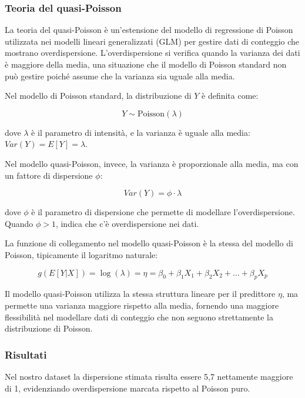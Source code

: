 \documentclass[
  italian,
  a4paper,
  a4paper,
  twoside,
  open=right,
  12pt]{scrbook}
\theoremstyle{definition}
\theoremstyle{remark}
\begin{document}
\subsubsection{Teoria del quasi-Poisson}\label{teoria-del-quasi-poisson}

La teoria del quasi-Poisson è un'estensione del modello di regressione
di Poisson utilizzata nei modelli lineari generalizzati (GLM) per
gestire dati di conteggio che mostrano overdispersione.
L'overdispersione si verifica quando la varianza dei dati è maggiore
della media, una situazione che il modello di Poisson standard non può
gestire poiché assume che la varianza sia uguale alla media.

Nel modello di Poisson standard, la distribuzione di \(Y\) è definita
come:

\[
Y \sim \text{Poisson}(\lambda)
\]

dove \(\lambda\) è il parametro di intensità, e la varianza è uguale
alla media: \(Var(Y) = E[Y] = \lambda\).

Nel modello quasi-Poisson, invece, la varianza è proporzionale alla
media, ma con un fattore di dispersione \(\phi\):

\[
Var(Y) = \phi \cdot \lambda
\]

dove \(\phi\) è il parametro di dispersione che permette di modellare
l'overdispersione. Quando \(\phi > 1\), indica che c'è overdispersione
nei dati.

La funzione di collegamento nel modello quasi-Poisson è la stessa del
modello di Poisson, tipicamente il logaritmo naturale:

\[
g(E[Y|X]) = \log(\lambda) = \eta = \beta_0 + \beta_1 X_1 + \beta_2 X_2 + \ldots + \beta_p X_p
\]

Il modello quasi-Poisson utilizza la stessa struttura lineare per il
predittore \(\eta\), ma permette una varianza maggiore rispetto alla
media, fornendo una maggiore flessibilità nel modellare dati di
conteggio che non seguono strettamente la distribuzione di Poisson.

\subsubsection{Risultati}\label{risultati}

Nel nostro dataset la dispersione stimata risulta essere 5,7 nettamente
maggiore di 1, evidenziando overdispersione marcata rispetto al Poisson
puro.
\end{document}
